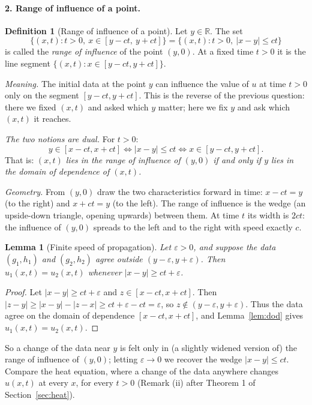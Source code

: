 \documentclass[11pt]{article}
\theoremstyle{plain}
\newtheorem{lemma}[theorem]{Lemma}
\theoremstyle{definition}
\newtheorem{definition}[theorem]{Definition}
\theoremstyle{remark}
\begin{document}
\paragraph{2. Range of influence of a point.}

\begin{definition}[Range of influence of a point]\label{def:roi}
Let $y \in \mathbb{R}$. The set
$$ \big\{(x,t) : t > 0,\ x \in [y - ct,\ y + ct]\big\} = \big\{(x,t) : t > 0,\ |x - y| \leq ct\big\} $$
is called the \emph{range of influence} of the point $(y,0)$. At a fixed time $t > 0$ it is the line segment $\{(x,t) : x \in [y - ct, y + ct]\}$.
\end{definition}

\emph{Meaning.} The initial data at the point $y$ can influence the value of $u$ at time $t > 0$ only on the segment $[y - ct, y + ct]$. This is the reverse of the previous question: there we fixed $(x,t)$ and asked which $y$ matter; here we fix $y$ and ask which $(x,t)$ it reaches.

\emph{The two notions are dual.} For $t > 0$:
$$ y \in [x - ct, x + ct] \iff |x - y| \leq ct \iff x \in [y - ct, y + ct]. $$
That is: \emph{$(x,t)$ lies in the range of influence of $(y,0)$ if and only if $y$ lies in the domain of dependence of $(x,t)$.}

\emph{Geometry.} From $(y,0)$ draw the two characteristics forward in time: $x - ct = y$ (to the right) and $x + ct = y$ (to the left). The range of influence is the wedge (an upside-down triangle, opening upwards) between them. At time $t$ its width is $2ct$: the influence of $(y,0)$ spreads to the left and to the right with speed exactly $c$.

\begin{lemma}[Finite speed of propagation]\label{lem:roi}
Let $\varepsilon > 0$, and suppose the data $(g_1,h_1)$ and $(g_2,h_2)$ agree outside $(y - \varepsilon, y + \varepsilon)$. Then $u_1(x,t) = u_2(x,t)$ whenever $|x - y| \geq ct + \varepsilon$.
\end{lemma}
\begin{proof}
Let $|x - y| \ge ct + \varepsilon$ and $z \in [x - ct, x + ct]$. Then $|z - y| \geq |x - y| - |z - x| \geq ct + \varepsilon - ct = \varepsilon$, so $z \notin (y - \varepsilon, y + \varepsilon)$. Thus the data agree on the domain of dependence $[x - ct, x + ct]$, and Lemma~\ref{lem:dod} gives $u_1(x,t) = u_2(x,t)$.
\end{proof}
So a change of the data near $y$ is felt only in (a slightly widened version of) the range of influence of $(y,0)$; letting $\varepsilon \to 0$ we recover the wedge $|x - y| \le ct$. Compare the heat equation, where a change of the data anywhere changes $u(x,t)$ at every $x$, for every $t > 0$ (Remark (ii) after Theorem 1 of Section~\ref{sec:heat}).
\end{document}

